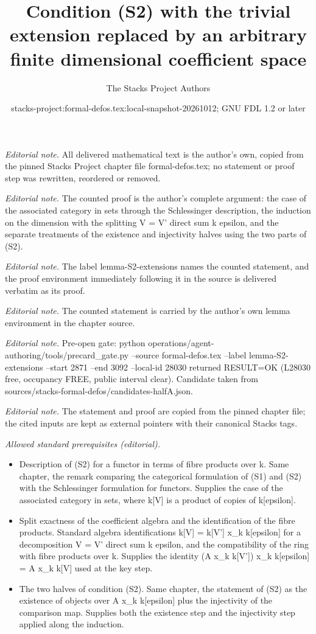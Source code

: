 \documentclass[10pt,a4paper]{amsart}
\title{Condition (S2) with the trivial extension replaced by an arbitrary finite dimensional coefficient space}
\author{The Stacks Project Authors}
\date{stacks-project:formal-defos.tex:local-snapshot-20261012; GNU FDL 1.2 or later}
\theoremstyle{plain}
\theoremstyle{definition}
\theoremstyle{remark}
\numberwithin{equation}{subsection}
\begin{document}
\maketitle
\noindent\textit{Editorial note.} All delivered mathematical text is the author's own, copied from the pinned Stacks Project chapter file formal-defos.tex; no statement or proof step was rewritten, reordered or removed.\par\medskip
\noindent\textit{Editorial note.} The counted proof is the author's complete argument: the case of the associated category in sets through the Schlessinger description, the induction on the dimension with the splitting V = V' direct sum k epsilon, and the separate treatments of the existence and injectivity halves using the two parts of (S2).\par\medskip
\noindent\textit{Editorial note.} The label lemma-S2-extensions names the counted statement, and the proof environment immediately following it in the source is delivered verbatim as its proof.\par\medskip
\noindent\textit{Editorial note.} The counted statement is carried by the author's own lemma environment in the chapter source.\par\medskip
\noindent\textit{Editorial note.} Pre-open gate: python operations/agent-authoring/tools/precard\_gate.py --source formal-defos.tex --label lemma-S2-extensions --start 2871 --end 3092 --local-id 28030 returned RESULT=OK (L28030 free, occupancy FREE, public interval clear). Candidate taken from sources/stacks-formal-defos/candidates-halfA.json.\par\medskip
\noindent\textit{Editorial note.} The statement and proof are copied from the pinned chapter file; the cited inputs are kept as external pointers with their canonical Stacks tags.\par\medskip
\noindent\textit{Allowed standard prerequisites (editorial).}\begin{itemize}
\item Description of (S2) for a functor in terms of fibre products over k. Same chapter, the remark comparing the categorical formulation of (S1) and (S2) with the Schlessinger formulation for functors. Supplies the case of the associated category in sets, where k[V] is a product of copies of k[epsilon].
\item Split exactness of the coefficient algebra and the identification of the fibre products. Standard algebra identifications k[V] = k[V'] x\_k k[epsilon] for a decomposition V = V' direct sum k epsilon, and the compatibility of the ring with fibre products over k. Supplies the identity (A x\_k k[V']) x\_k k[epsilon] = A x\_k k[V] used at the key step.
\item The two halves of condition (S2). Same chapter, the statement of (S2) as the existence of objects over A x\_k k[epsilon] plus the injectivity of the comparison map. Supplies both the existence step and the injectivity step applied along the induction.
\end{itemize}\medskip
\end{document}
